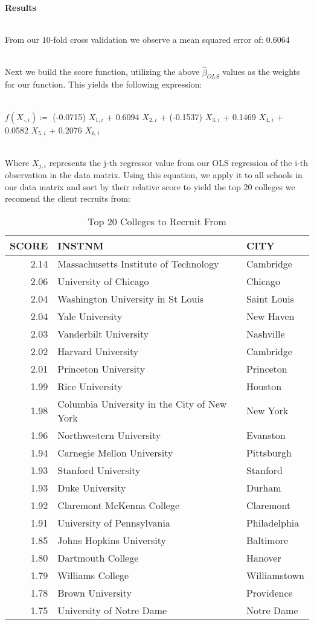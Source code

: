 \documentclass{article}
\begin{document}



{\large\textbf{Results}} \\\

From our $10$-fold cross validation we observe a mean squared error of: 0.6064 \\\

Next we build the score function, utilizing the above $\hat{\beta}_{OLS}$ values as the weights for our function. This yields the following expression:\\\

$f(X_{\cdot,i}) \coloneqq $ (-0.0715)  $  X_{1,i}$ + 0.6094 $  X_{2,i}$ + (-0.1537) $  X_{3,i}$ + 0.1469 $  X_{4,i}$ + 0.0582 $  X_{5,i}$ + 0.2076 $  X_{6,i}$ \\\

Where $X_{j,i}$ represents the j-th regressor value from our OLS regression of the i-th observation in the data matrix. Using this equation, we apply it to all schools in our data matrix and sort by their relative score to yield the top 20 colleges we recomend the client recruits from:
\begin{table}[ht]
\centering
\begin{tabular}{rll}
  \hline
SCORE & INSTNM & CITY \\ 
  \hline
2.14 & Massachusetts Institute of Technology & Cambridge \\ 
  2.06 & University of Chicago & Chicago \\ 
  2.04 & Washington University in St Louis & Saint Louis \\ 
  2.04 & Yale University & New Haven \\ 
  2.03 & Vanderbilt University & Nashville \\ 
  2.02 & Harvard University & Cambridge \\ 
  2.01 & Princeton University & Princeton \\ 
  1.99 & Rice University & Houston \\ 
  1.98 & Columbia University in the City of New York & New York \\ 
  1.96 & Northwestern University & Evanston \\ 
  1.94 & Carnegie Mellon University & Pittsburgh \\ 
  1.93 & Stanford University & Stanford \\ 
  1.93 & Duke University & Durham \\ 
  1.92 & Claremont McKenna College & Claremont \\ 
  1.91 & University of Pennsylvania & Philadelphia \\ 
  1.85 & Johns Hopkins University & Baltimore \\ 
  1.80 & Dartmouth College & Hanover \\ 
  1.79 & Williams College & Williamstown \\ 
  1.78 & Brown University & Providence \\ 
  1.75 & University of Notre Dame & Notre Dame \\ 
   \hline
\end{tabular}
\caption{Top 20 Colleges to Recruit From} 
\end{table}
\end{document}
